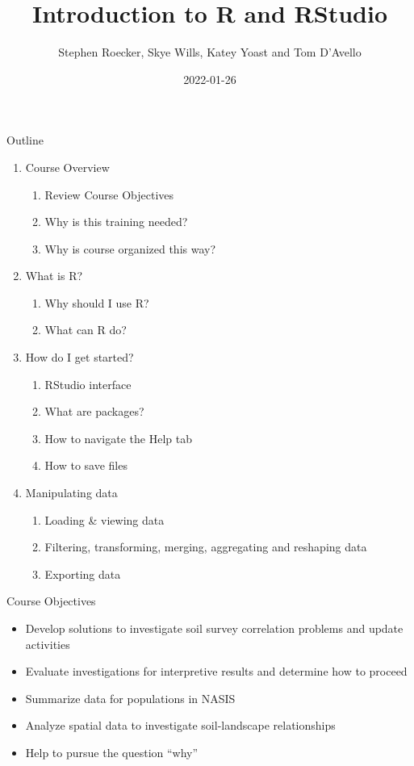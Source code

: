 \documentclass[
  ignorenonframetext,
]{beamer}
\title{Introduction to R and RStudio}
\author{Stephen Roecker, Skye Wills, Katey Yoast and Tom D'Avello}
\date{2022-01-26}
\providecommand{\tightlist}{%
  \setlength{\itemsep}{0pt}\setlength{\parskip}{0pt}}
\begin{document}
\frame{\titlepage}

\begin{frame}{Outline}
\protect\hypertarget{outline}{}
\begin{enumerate}
\tightlist
\item
  Course Overview

  \begin{enumerate}
  \tightlist
  \item
    Review Course Objectives
  \item
    Why is this training needed?
  \item
    Why is course organized this way?
  \end{enumerate}
\item
  What is R?

  \begin{enumerate}
  \tightlist
  \item
    Why should I use R?
  \item
    What can R do?
  \end{enumerate}
\item
  How do I get started?

  \begin{enumerate}
  \tightlist
  \item
    RStudio interface
  \item
    What are packages?
  \item
    How to navigate the Help tab
  \item
    How to save files
  \end{enumerate}
\item
  Manipulating data

  \begin{enumerate}
  \tightlist
  \item
    Loading \& viewing data
  \item
    Filtering, transforming, merging, aggregating and reshaping data
  \item
    Exporting data
  \end{enumerate}
\end{enumerate}
\end{frame}

\begin{frame}{Course Objectives}
\protect\hypertarget{course-objectives}{}
\begin{itemize}
\tightlist
\item
  Develop solutions to investigate soil survey correlation problems and
  update activities
\item
  Evaluate investigations for interpretive results and determine how to
  proceed
\item
  Summarize data for populations in NASIS
\item
  Analyze spatial data to investigate soil-landscape relationships
\item
  Help to pursue the question ``why''
\end{itemize}
\end{frame}
\end{document}
